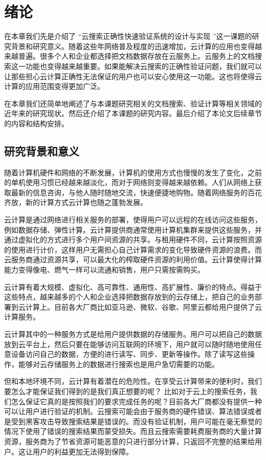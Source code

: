 \chapter{绪论}
\label{chap:introduction}

在本章我们先是介绍了
“云搜索正确性快速验证系统的设计与实现
”这一课题的研究背景和研究意义。随着这些年网络普及程度的迅速增加，云计算的应用也变得越来越普遍。很多个人和企业都选择把文档数据存放在云服务上。云服务上的文档搜索这一功能也变得越来越重要。如果能解决云搜索的正确性验证问题，我们就可以让那些担心云计算正确性无法保证的用户也可以安心使用这一功能。这也将使得云计算的应用范围变得更加广泛。

在本章我们还简单地阐述了与本课题研究相关的文档搜索、验证计算等相关领域的近年来的研究现状。然后还介绍了本课题的研究内容。最后介绍了本论文后续章节的内容和结构安排。

\section{研究背景和意义}
随着计算机硬件和网络的不断发展，计算机的使用方式也慢慢的发生了变化，之前的单机使用习惯已经越来越淡化，而对于网络则变得越来越依赖。人们从网络上获取最新的信息咨询，与他人随时随地交流，快速便捷地购物。随着网络服务的百花齐放，新的计算方式云计算也随之蓬勃发展。

云计算是通过网络进行相关服务的部署，使得用户可以远程的在线访问这些服务，例如数据存储、弹性计算。云计算提供商通常使用计算机集群来提供这些服务，并通过虚拟化的方式进行多个用户间资源的共享。与租用硬件不同，云计算按照资源的使用进行计价，这样用户无需担心自己计算需求的变化导致硬件资源的浪费。而云服务商通过资源共享，可以最大化的榨取硬件资源的利用价值。云计算使得计算能力变得像电、燃气一样可以流通和销售，用户只需按需购买。

云计算有着大规模、虚拟化、高可靠性、通用性、高扩展性、廉价的特点。得益于这些特点，越来越多的个人和企业选择把数据存放到的云存储上，把自己的业务部署到云计算上。目前各大厂商比如亚马逊、微软、谷歌、阿里云都给用户提供了云计算服务。

云计算其中的一种服务方式是给用户提供数据的存储服务。用户可以把自己的数据放到云平台上，然后只要在能够访问互联网的环境下，用户就可以随时随地使用任意设备访问自己的数据，方便的进行读写、同步、更新等操作。除了读写这些操作，能够对云存储服务上的数据进行搜索也是用户急切需要的功能。

但和本地环境不同，云计算有着潜在的危险性。在享受云计算带来的便利时，我们要怎么才能保证我们得到的是我们真正想要的呢？
比如对于云上的搜索任务，我们怎么保证它真的是按照我们的要求完成任务的呢？目前各大厂商都没有提供一种可以让用户进行验证的机制。云搜索可能会由于服务商的硬件错误、算法错误或者是受到黑客攻击导致搜索结果是错误的。而没有验证机制，用户可能在毫无察觉的情况下使用了错误的搜索结果而蒙受损失。而且云搜索需要耗费服务商的大量计算资源，服务商为了节省资源可能恶意的只进行部分计算，只返回不完整的结果给用户。这让用户的利益更加无法得到保障。


